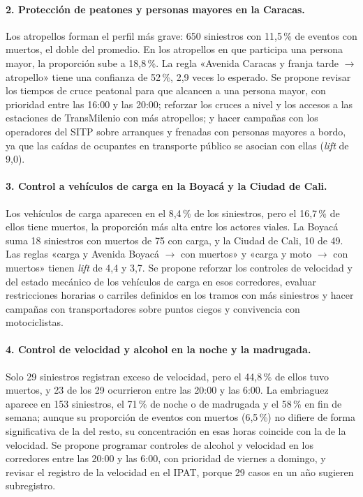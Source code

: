 \documentclass[12pt,letterpaper]{article}
\begin{document}
\paragraph{2. Protección de peatones y personas mayores en la Caracas.}
Los atropellos forman el perfil más grave: 650 siniestros con 11,5\,\%
de eventos con muertos, el doble del promedio. En los atropellos en que
participa una persona mayor, la proporción sube a 18,8\,\%. La regla «Avenida Caracas
y franja tarde $\rightarrow$ atropello» tiene una confianza de 52\,\%,
2,9 veces lo esperado. Se propone revisar los tiempos de cruce peatonal
para que alcancen a una persona mayor, con prioridad entre las 16:00 y
las 20:00; reforzar los cruces a nivel y los accesos a las estaciones
de TransMilenio con más atropellos; y hacer campañas con los operadores
del SITP sobre arranques y frenadas con personas mayores a bordo, ya que
las caídas de ocupantes en transporte público se asocian con ellas
(\emph{lift} de 9,0).

\paragraph{3. Control a vehículos de carga en la Boyacá y la Ciudad de Cali.}
Los vehículos de carga aparecen en el 8,4\,\% de los siniestros, pero el
16,7\,\% de ellos tiene muertos, la proporción más alta entre los actores
viales. La Boyacá suma 18 siniestros con muertos de 75 con carga, y la
Ciudad de Cali, 10 de 49. Las reglas «carga y Avenida Boyacá
$\rightarrow$ con muertos» y «carga y moto $\rightarrow$ con muertos»
tienen \emph{lift} de 4,4 y 3,7. Se propone reforzar los controles de
velocidad y del estado mecánico de los vehículos de carga en esos
corredores, evaluar restricciones horarias o carriles definidos en los
tramos con más siniestros y hacer campañas con transportadores sobre
puntos ciegos y convivencia con motociclistas.

\paragraph{4. Control de velocidad y alcohol en la noche y la madrugada.}
Solo 29 siniestros registran exceso de velocidad, pero el 44,8\,\% de
ellos tuvo muertos, y 23 de los 29 ocurrieron entre las 20:00 y las
6:00. La embriaguez aparece en 153 siniestros, el 71\,\% de noche o de
madrugada y el 58\,\% en fin de semana; aunque su proporción de
eventos con muertos (6,5\,\%) no difiere de forma significativa de la
del resto, su concentración en esas horas coincide con la de la
velocidad. Se propone programar controles
de alcohol y velocidad en los corredores entre las 20:00 y las 6:00, con
prioridad de viernes a domingo, y revisar el registro de la velocidad en
el IPAT, porque 29 casos en un año sugieren subregistro.
\end{document}
